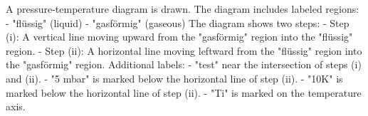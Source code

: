 A pressure-temperature diagram is drawn. The diagram includes labeled regions:  
- "flüssig" (liquid)  
- "gasförmig" (gaseous)  
The diagram shows two steps:  
- Step (i): A vertical line moving upward from the "gasförmig" region into the "flüssig" region.  
- Step (ii): A horizontal line moving leftward from the "flüssig" region into the "gasförmig" region.  
Additional labels:  
- "test" near the intersection of steps (i) and (ii).  
- "5 mbar" is marked below the horizontal line of step (ii).  
- "10K" is marked below the horizontal line of step (ii).  
- "Ti" is marked on the temperature axis.